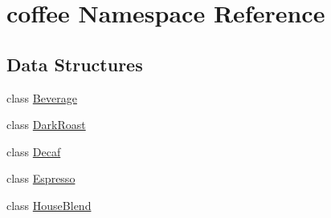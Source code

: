 \hypertarget{namespacecoffee}{\section{coffee Namespace Reference}
\label{namespacecoffee}
}
\subsection*{Data Structures}
\begin{DoxyCompactItemize}
\item 
class \hyperlink{classcoffee_1_1Beverage}{Beverage}
\item 
class \hyperlink{classcoffee_1_1DarkRoast}{Dark\-Roast}
\item 
class \hyperlink{classcoffee_1_1Decaf}{Decaf}
\item 
class \hyperlink{classcoffee_1_1Espresso}{Espresso}
\item 
class \hyperlink{classcoffee_1_1HouseBlend}{House\-Blend}
\end{DoxyCompactItemize}
